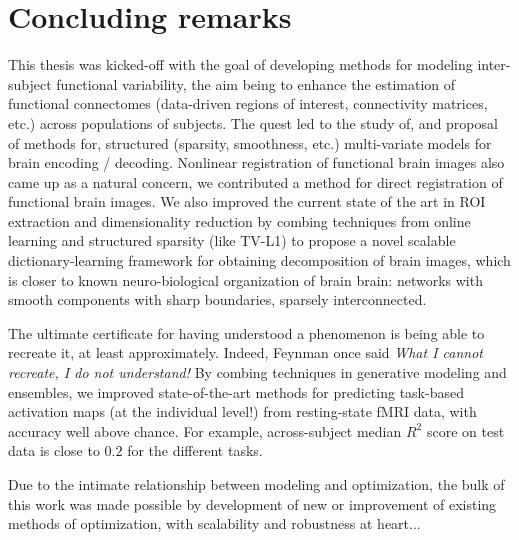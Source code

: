 \chapter{Concluding remarks}\label{chap:conclusion}

This thesis was kicked-off with the goal of developing methods for modeling inter-subject
functional variability, the aim being to enhance the estimation of functional connectomes
(data-driven regions of interest, connectivity matrices, etc.)
across populations of subjects. The quest led to the study of, and proposal of methods for, structured (sparsity, smoothness, etc.) multi-variate models for brain encoding / decoding. Nonlinear registration of functional brain images also came up as a natural concern, we contributed a method for direct registration of functional brain images. We also improved the current state of the art in ROI extraction and dimensionality reduction by combing techniques from online learning and structured sparsity (like TV-L1) to propose a novel scalable dictionary-learning framework for obtaining decomposition of brain images, which is closer to known neuro-biological organization of brain brain: networks with smooth components with sharp boundaries, sparsely interconnected.

The ultimate certificate for having understood a phenomenon is being able to recreate it, at least approximately. Indeed, Feynman once said \textit{What I cannot recreate, I do not understand!} By combing techniques in generative modeling and ensembles, we improved state-of-the-art methods for predicting task-based activation maps (at the individual level!) from resting-state fMRI data, with accuracy well above chance. For example, across-subject median $R^2$ score on test data is close to $0.2$ for the different tasks.

Due to the intimate relationship between modeling and optimization, the
bulk of this work was made possible by development of new or improvement of existing methods of
optimization, with scalability and robustness at heart...





